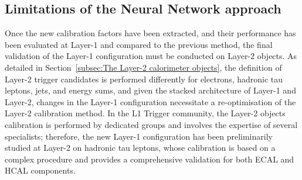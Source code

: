 \begin{figure}
    \centering
    \hspace{1cm}
    \caption{}
    \label{fig:NN_HyperParameters}
\end{figure}

\subsection{Limitations of the Neural Network approach}

Once the new calibration factors have been extracted, and their performance has been evaluated at Layer-1 and compared to the previous method, the final validation of the Layer-1 configuration must be conducted on Layer-2 objects. 
As detailed in Section~\ref{subsec:The Layer-2 calorimeter objects}, the definition of Layer-2 trigger candidates is performed differently for electrons, hadronic tau leptons, jets, and energy sums, and given the stacked architecture of Layer-1 and Layer-2, changes in the Layer-1 configuration necessitate a re-optimisation of the Layer-2 calibration method. 
In the L1 Trigger community, the Layer-2 objects calibration is performed by dedicated groups and involves the expertise of several specialists; therefore, the new Layer-1 configuration has been preliminarily studied at Layer-2 on hadronic tau leptons, whose calibration is based on a complex procedure and provides a comprehensive validation for both ECAL and HCAL components.

